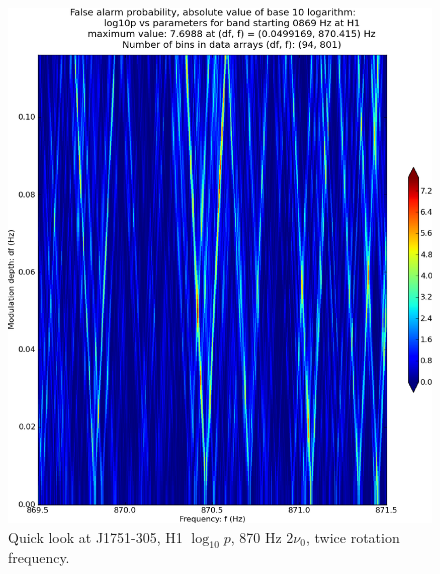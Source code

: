 \begin{figure}
\begin{center}
\includegraphics[width=0.68\paperwidth,height=0.48\paperheight]{plots/DFvsFresultsProb-H1_pulsar-0869.eps}
\caption{
Quick look at J1751-305, H1 $\log_{10}p$, 870 Hz $2\nu_0$, twice rotation frequency.}
\end{center}
\end{figure}


